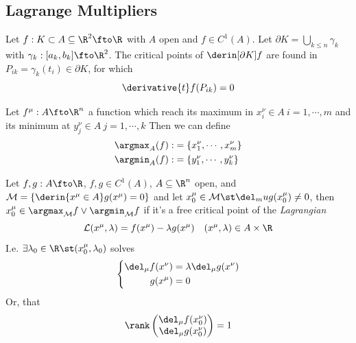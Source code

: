 \documentclass[../mmf.tex]{subfiles}
\begin{document}
\subsection{Lagrange Multipliers}
\begin{dfn}
	Let $f:K\subset A\subseteq\R^2\fto\R$ with $A$ open and $f\in C^1(A)$. Let $\partial{K}=\bigcup_{k\le n}\gamma_k$ with $\gamma_k:[a_k,b_k]\fto\R^2$. The critical points of $\derin[\partial{K}]{f}$ are found in $P_{ik}=\gamma_k(t_i)\in\partial{K}$, for which
	\begin{equation*}
		\derivative{t}f(P_{ik})=0
	\end{equation*}
\end{dfn}
\begin{dfn}
	Let $f^\mu:A\fto\R^n$ a function which reach its maximum in $x^\nu_i\in A\ i=1,\cdots,m$ and its minimum at $y^\nu_j\in A\ j=1,\cdots,k$ Then we can define
	\begin{equation}
		\begin{aligned}
			\argmax_A(f):&=\{x^\nu_1,\cdots,x^\nu_m\}\\
			\argmin_A(f):&=\{y^\nu_1,\cdots,y^\nu_k\}
		\end{aligned}
		\label{eq:argminmax}
	\end{equation}
\end{dfn}
\begin{thm}
	Let $f,g:A\fto\R$, $f,g\in C^1(A)$, $A\subseteq\R^n$ open, and $\mathcal{M}=\{\derin{x^\mu\in A}g(x^\mu)=0\}$ and let $x^\mu_0\in\mathcal{M}\st\del_mu g(x^\mu_0)\ne0$, then $x^\mu_0\in\argmax_{\mathcal{M}}f\vee\argmin_{\mathcal{M}}f$ if it's a free critical point of the \textit{Lagrangian}
	\begin{equation}
		\mathcal{L}(x^\mu,\lambda)=f(x^\mu)-\lambda g(x^\mu)\quad(x^\mu,\lambda)\in A\times\R
		\label{eq:lagrangian}
	\end{equation}
	I.e. $\exists\lambda_0\in\R\st(x^\mu_0,\lambda_0)$ solves
	\begin{equation}
		\left\{ \begin{aligned}
				\del_\mu f(x^\nu)&=\lambda\del_\mu g(x^\nu)\\
				g(x^\mu)&=0
		\end{aligned} \right.
		\label{eq:lagrangesystem}
	\end{equation}
	Or, that
	\begin{equation*}
		\rank\begin{pmatrix}\del_\mu f(x^\nu_0)\\\del_\mu g(x^\nu_0)\end{pmatrix}=1
	\end{equation*}
\end{thm}
\end{document}
